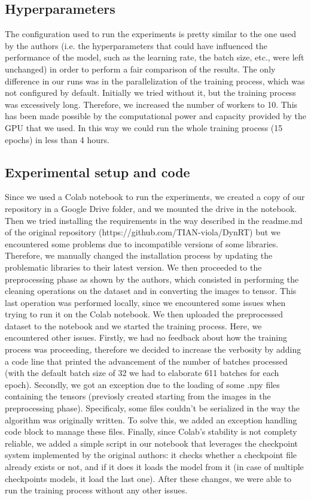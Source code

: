 \subsection{Hyperparameters}
The configuration used to run the experiments is pretty similar to the one used by the authors (i.e. the hyperparameters that could have influenced the performance of the model, such as the learning rate, the batch size, etc., were left unchanged) in order to perform a fair comparison of the results. The only difference in our runs was in the parallelization of the training process, which was not configured by default. Initially we tried without it, but the training process was excessively long. Therefore, we increased the number of workers to 10. This has been made possible by the computational power and capacity provided by the GPU that we used. In this way we could run the whole training process (15 epochs) in less than 4 hours. 

\subsection{Experimental setup and code}
Since we used a Colab notebook to run the experiments, we created a copy of our repository in a Google Drive folder, and we mounted the drive in the notebook. Then we tried installing the requirements in the way described in the readme.md of the original repository (https://github.com/TIAN-viola/DynRT) but we encountered some problems due to incompatible versions of some libraries. Therefore, we manually changed the installation process by updating the problematic libraries to their latest version.
We then proceeded to the preprocessing phase as shown by the authors, which consisted in performing the cleaning operations on the dataset and in converting the images to tensor. This last operation was performed locally, since we encountered some issues when trying to run it on the Colab notebook. We then uploaded the preprocessed dataset to the notebook and we started the training process. Here, we encountered other issues. Firstly, we had no feedback about how the training process was proceeding, therefore we decided to increase the verbosity by adding a code line that printed the advancement of the number of batches processed (with the default batch size of 32 we had to elaborate 611 batches for each epoch). Secondly, we got an exception due to the loading of some .npy files containing the tensors (previosly created starting from the images in the preprocessing phase). Specificaly, some files couldn't be serialized in the way the algorithm was originally written. To solve this, we added an exception handling code block to manage these files. Finally, since Colab's stability is not complety reliable, we added a simple script in our notebook that leverages the checkpoint system implemented by the original authors: it checks whether a checkpoint file already exists or not, and if it does it loads the model from it (in case of multiple checkpoints models, it load the last one).
After these changes, we were able to run the training process without any other issues.


